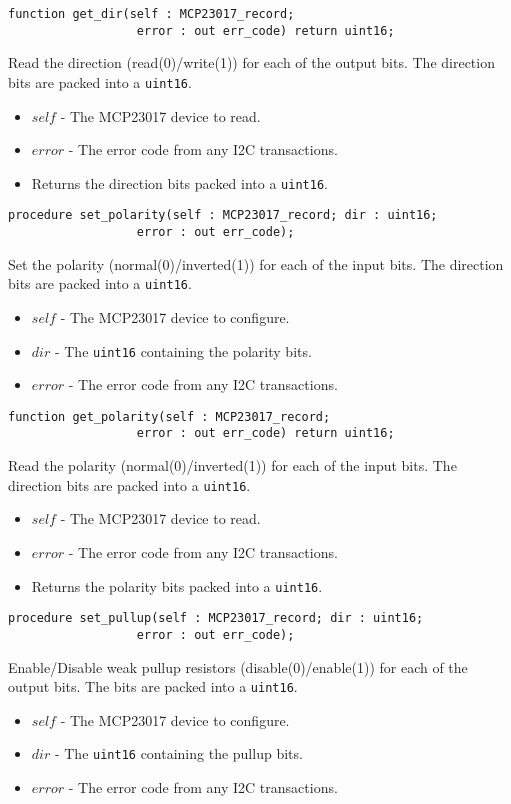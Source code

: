 \documentclass[10pt, openany]{book}
\newcommand{\datatype}[1]{\texttt{#1}}
\begin{document}
\begin{lstlisting}
function get_dir(self : MCP23017_record;
                  error : out err_code) return uint16;
\end{lstlisting}
Read the direction (read(0)/write(1)) for each of the output bits.  The direction bits are packed into a \datatype{uint16}.
\begin{itemize}
  \item $self$ - The MCP23017 device to read.
  \item $error$ - The error code from any I2C transactions.
  \item Returns the direction bits packed into a \datatype{uint16}.
\end{itemize}

\begin{lstlisting}
procedure set_polarity(self : MCP23017_record; dir : uint16;
                  error : out err_code);
\end{lstlisting}
Set the polarity (normal(0)/inverted(1)) for each of the input bits.  The direction bits are packed into a \datatype{uint16}.
\begin{itemize}
  \item $self$ - The MCP23017 device to configure.
  \item $dir$ - The \datatype{uint16} containing the polarity bits.
  \item $error$ - The error code from any I2C transactions.
\end{itemize}

\begin{lstlisting}
function get_polarity(self : MCP23017_record;
                  error : out err_code) return uint16;
\end{lstlisting}
Read the polarity (normal(0)/inverted(1)) for each of the input bits.  The direction bits are packed into a \datatype{uint16}.
\begin{itemize}
  \item $self$ - The MCP23017 device to read.
  \item $error$ - The error code from any I2C transactions.
  \item Returns the polarity bits packed into a \datatype{uint16}.
\end{itemize}

\begin{lstlisting}
procedure set_pullup(self : MCP23017_record; dir : uint16;
                  error : out err_code);
\end{lstlisting}
Enable/Disable weak pullup resistors (disable(0)/enable(1)) for each of the output bits.  The bits are packed into a \datatype{uint16}.
\begin{itemize}
  \item $self$ - The MCP23017 device to configure.
  \item $dir$ - The \datatype{uint16} containing the pullup bits.
  \item $error$ - The error code from any I2C transactions.
\end{itemize}
\end{document}
